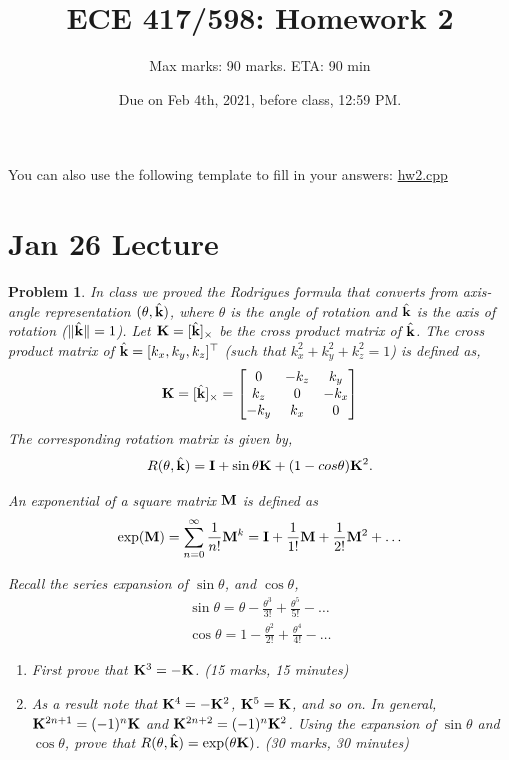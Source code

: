 \documentclass[twocolumn]{article}
\title{ECE 417/598: Homework 2}
\author{Max marks: 90 marks. ETA: 90 min}
\date{Due on Feb 4th, 2021, before class, 12:59 PM.}
\newtheorem{prob}{Problem}
\newif\ifsol
\begin{document}
\maketitle

You can also use the following template to fill in your answers: \href{https://vikasdhiman.info/ECE417-Mobile-Robots/hw/hw2/code/hw2.cpp}{hw2.cpp}

\section{Jan 26 Lecture}

\begin{prob}
  In class we proved the Rodrigues formula that converts from axis-angle
  representation $(\theta, \hat{\mathbf{k}})$, where $\theta$ is the angle of rotation
  and $\hat{\mathbf{k}}$ is the axis of rotation ($\|\hat{\mathbf{k}}\| = 1$). Let $\mathbf{K} = [\hat{\mathbf{k}}]_{\times}$ be
  the cross product matrix of $\hat{\mathbf{k}}$. The cross product matrix
  of $\hat{\mathbf{k}} = [k_x, k_y, k_z]^\top$ (such that $k_x^2 + k_y^2 + k_z^2 = 1$) is defined as,
    \begin{align}
      \mathbf{K} = [\hat{\mathbf{k}}]_{\times} = \begin{bmatrix}
        0 & -k_z & k_y \\
        k_z & 0 & -k_x \\
        -k_y & k_x & 0
      \end{bmatrix}
    \end{align}
  The corresponding rotation matrix is
  given by,
  \begin{align}
    R(\theta, \hat{\mathbf{k}}) = \mathbf{I} + \sin \theta \mathbf{K} + (1-cos \theta) \mathbf{K}^2.
  \end{align}

  An exponential of a square matrix $\mathbf{M}$ is defined as
  \begin{align}
    \exp(\mathbf{M}) = \sum_{n=0}^\infty \frac{1}{n!} \mathbf{M}^k = \mathbf{I} + \frac{1}{1!}\mathbf{M} + \frac{1}{2!}\mathbf{M}^2 + \dots
  \end{align}

  Recall the series expansion of $\sin \theta$, and $\cos \theta$,
  \begin{align}
    \sin \theta = \theta - \frac{\theta^3}{3!} + \frac{\theta^5}{5!} - \dots
    \\
    \cos \theta = 1 - \frac{\theta^2}{2!} + \frac{\theta^4}{4!} - \dots
  \end{align}

  \begin{enumerate}
  \item First prove that $\mathbf{K}^3 = - \mathbf{K}$. (15 marks, 15 minutes)
  \item As a result note that $\mathbf{K}^4 = - \mathbf{K}^2$, $\mathbf{K}^5 = \mathbf{K}$, and so on.
    In general, $\mathbf{K}^{2n+1} =
    (-1)^n\mathbf{K}$ and $\mathbf{K}^{2n+2} = (-1)^n\mathbf{K}^2$. Using the expansion of $\sin\theta$ and $\cos\theta$, prove that
    $R(\theta, \hat{\mathbf{k}}) = \exp(\theta \mathbf{K})$. (30 marks, 30 minutes)
  \end{enumerate}
\end{prob}
\ifsol
\end{document}
